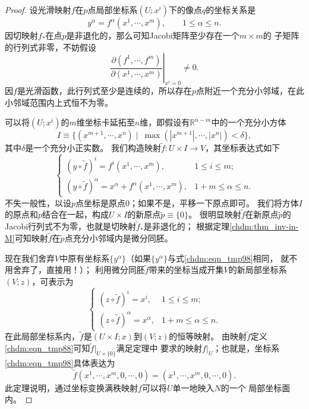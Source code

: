 \begin{proof}
    设光滑映射$f$在$p$点局部坐标系$(U;x^i)$下的像点$q$的坐标关系是
    \begin{equation*}
        y^\alpha = f^\alpha(x^1,\cdots,x^m), \qquad 1 \leqslant \alpha \leqslant n .
    \end{equation*}
    因切映射$f_{*}$在点$p$是非退化的，那么可知Jacobi矩阵至少存在一个$m\times m$的
    子矩阵的行列式非零，不妨假设
    \begin{equation*}
      \left. \frac{\partial ({f^1,\cdots,f^m})}{\partial ({x^1,\cdots,x^m})} \right|_{x^i=0} \neq 0.
    \end{equation*}
    因$f$是光滑函数，此行列式至少是连续的，所以存在$p$点附近一个充分小邻域，在此小邻域范围内上式恒不为零。
    
    可以将$(U;x^i)$的$m$维坐标卡延拓至$n$维，即假设有$\mathbb{R}^{n-m}$中的一个充分小方体
    \begin{equation*}
        I\equiv \{(x^{m+1},\cdots,x^n) \mid \ \max(|x^{m+1}|,\cdots,|x^n|) < \delta \} ,
    \end{equation*}
    其中$\delta$是一个充分小正实数。
    我们构造映射$\tilde{f}:U\times I \to V$，其坐标表达式如下
    \begin{equation}\label{chdm:eqn_tmp88}
        \begin{cases}
            (y\circ \tilde{f})^i = f^i(x^1,\cdots,x^m), & 1 \leqslant i \leqslant m; \\
            (y\circ \tilde{f})^\alpha =x^\alpha+ f^\alpha(x^1,\cdots,x^m), & 1+m \leqslant \alpha \leqslant n .
        \end{cases}
    \end{equation}
    不失一般性，以设$p$点坐标是原点$0$；如果不是，平移一下原点即可。
    我们将方体$I$的原点和$p$结合在一起，构成$U\times I $的新原点$\tilde{p}\equiv\{0\}$。
    很明显映射$\tilde{f}$在新原点$\tilde{p}$的Jacobi行列式不为零，也就是切映射$\tilde{f}_{*}$是非退化的；
    根据定理\ref{chdm:thm_inv-in-M}可知映射$\tilde{f}$在$\tilde{p}$点充分小邻域内是微分同胚。
    
    现在我们舍弃$V$中原有坐标系$\{y^\alpha\}$（如果$\{y^\alpha\}$与式\eqref{chdm:eqn_tmp98}相同，
    就不用舍弃了，直接用！）；
    利用微分同胚$\tilde{f}$带来的坐标当成开集$V$的新局部坐标系$(V;z)$，可表示为
    \begin{equation}\label{chdm:eqn_tmp98}
    \begin{cases}
        (z\circ \tilde{f})^i = x^i, & 1 \leqslant i \leqslant m; \\
        (z\circ \tilde{f})^\alpha =x^\alpha, & 1+m \leqslant \alpha \leqslant n .
    \end{cases}
    \end{equation}
    在此局部坐标系内，$\tilde{f}$是$(U\times I;x)$到$(V;z)$的恒等映射。
    由映射$\tilde{f}$定义\eqref{chdm:eqn_tmp88}可知$\tilde{f}|_{U\times\{0\}}$满足定理中
    要求的映射$f|_U$；也就是，坐标系\eqref{chdm:eqn_tmp98}具体表达为
    \begin{equation}
        \tilde{f}(x^1,\cdots,x^m,0,\cdots,0)
        = (x^1,\cdots,x^m,0,\cdots,0).
    \end{equation}
    此定理说明，通过坐标变换满秩映射$f$可以将$U$单一地映入$N$的一个
    局部坐标面内。
\end{proof}


